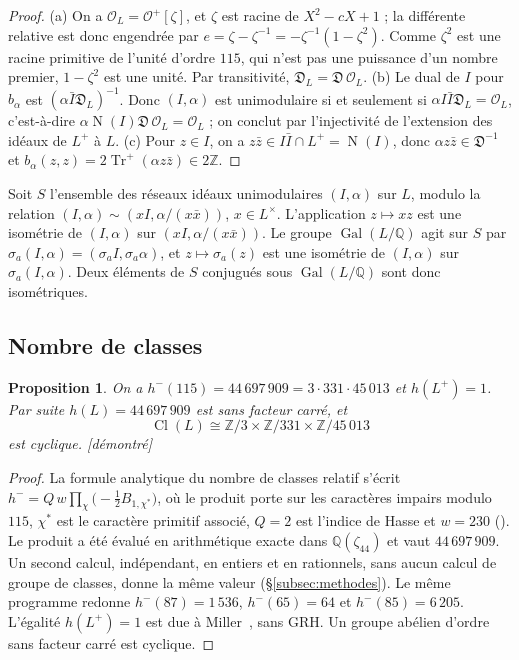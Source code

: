 \documentclass[11pt,a4paper]{amsart}
\theoremstyle{plain}
\newtheorem{proposition}[theoreme]{Proposition}
\theoremstyle{definition}
\numberwithin{equation}{section}
\newcommand{\Q}{\mathbb{Q}}
\newcommand{\Z}{\mathbb{Z}}
\newcommand{\OO}{\mathcal{O}}
\newcommand{\Op}{\mathcal{O}^{+}}
\newcommand{\Dif}{\mathfrak{D}}
\DeclareMathOperator{\Tr}{Tr}
\DeclareMathOperator{\Nm}{N}
\DeclareMathOperator{\Cl}{Cl}
\DeclareMathOperator{\Gal}{Gal}
\newcommand{\Trp}{\Tr^{+}}
\newcommand{\st}[1]{\textup{\textsf{\small[#1]}}}
\newcommand{\DEM}{\st{démontré}}
\begin{document}
\begin{proof}
(a) On a $\OO_L=\Op[\zeta]$, et $\zeta$ est racine de $X^2-cX+1$ ; la différente relative est donc engendrée par $e=\zeta-\zeta^{-1}=-\zeta^{-1}(1-\zeta^2)$. Comme $\zeta^2$ est une racine primitive de l'unité d'ordre $115$, qui n'est pas une puissance d'un nombre premier, $1-\zeta^2$ est une unité. Par transitivité, $\Dif_L=\Dif\,\OO_L$.
(b) Le dual de $I$ pour $b_\alpha$ est $(\alpha\bar I\Dif_L)^{-1}$. Donc $(I,\alpha)$ est unimodulaire si et seulement si $\alpha I\bar I\Dif_L=\OO_L$, c'est-à-dire $\alpha\Nm(I)\Dif\,\OO_L=\OO_L$ ; on conclut par l'injectivité de l'extension des idéaux de $L^+$ à $L$.
(c) Pour $z\in I$, on a $z\bar z\in I\bar I\cap L^+=\Nm(I)$, donc $\alpha z\bar z\in\Dif^{-1}$ et $b_\alpha(z,z)=2\Trp(\alpha z\bar z)\in2\Z$.
\end{proof}

Soit $S$ l'ensemble des réseaux idéaux unimodulaires $(I,\alpha)$ sur $L$, modulo la relation $(I,\alpha)\sim(xI,\alpha/(x\bar x))$, $x\in L^\times$. L'application $z\mapsto xz$ est une isométrie de $(I,\alpha)$ sur $(xI,\alpha/(x\bar x))$. Le groupe $\Gal(L/\Q)$ agit sur $S$ par $\sigma_a(I,\alpha)=(\sigma_aI,\sigma_a\alpha)$, et $z\mapsto\sigma_a(z)$ est une isométrie de $(I,\alpha)$ sur $\sigma_a(I,\alpha)$. Deux éléments de $S$ conjugués sous $\Gal(L/\Q)$ sont donc isométriques.

\subsection{Nombre de classes}

\begin{proposition}\label{prop:hmoins}
On a $h^-(115)=44\,697\,909=3\cdot331\cdot45\,013$ et $h(L^+)=1$. Par suite $h(L)=44\,697\,909$ est sans facteur carré, et
\[
\Cl(L)\cong\Z/3\times\Z/331\times\Z/45\,013
\]
est cyclique. \DEM
\end{proposition}

\begin{proof}
La formule analytique du nombre de classes relatif s'écrit $h^-=Q\,w\prod_{\chi}\bigl(-\tfrac12B_{1,\chi^*}\bigr)$, où le produit porte sur les caractères impairs modulo $115$, $\chi^*$ est le caractère primitif associé, $Q=2$ est l'indice de Hasse et $w=230$ (\cite[th.~4.17]{Was97}). Le produit a été évalué en arithmétique exacte dans $\Q(\zeta_{44})$ et vaut $44\,697\,909$. Un second calcul, indépendant, en entiers et en rationnels, sans aucun calcul de groupe de classes, donne la même valeur (\S\ref{subsec:methodes}). Le même programme redonne $h^-(87)=1\,536$, $h^-(65)=64$ et $h^-(85)=6\,205$. L'égalité $h(L^+)=1$ est due à Miller~\cite[th.~1.1]{Mil14}, sans GRH. Un groupe abélien d'ordre sans facteur carré est cyclique.
\end{proof}
\end{document}
